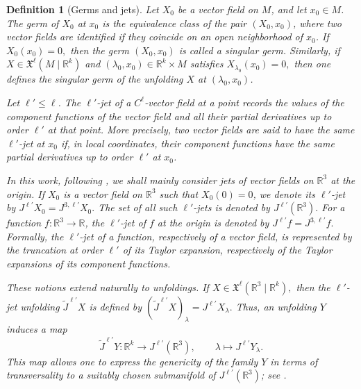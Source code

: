 \documentclass[12pt]{article}
\newtheorem{definition}{Definition}[section]
\newtheorem{remark definition}{Remark Definition}[section]
\begin{document}
	\begin{definition}[Germs and jets]
		Let $X_0$ be a vector field on $M$, and let $x_0\in M$. The germ of
		$X_0$ at $x_0$ is the equivalence class of the pair $(X_0,x_0)$, where two
		vector fields are identified if they coincide on an open neighborhood of
		$x_0$. If $X_0(x_0)=0,$ then the germ $(X_0,x_0)$ is called a singular germ. 
		Similarly, if $X\in \mathfrak{X}^{\ell}(M\mid \mathbb{R}^k)	$
		and $(\lambda_0,x_0)\in \mathbb{R}^k\times M$ satisfies $X_{\lambda_0}(x_0)=0,
		$
		then one defines the singular germ of the unfolding $X$ at
		$(\lambda_0,x_0)$.
		
		Let $\ell'\leq \ell$. The $\ell'$-jet of a $C^\ell$-vector field at a
		point records the values of the component functions of the vector field and
		all their partial derivatives up to order $\ell'$ at that point. More
		precisely, two vector fields are said to have the same $\ell'$-jet at
		$x_0$ if, in local coordinates, their component functions have the same
		partial derivatives up to order $\ell'$ at $x_0$.
		
		In this work, following \cite[Def.~1.2]{v}, we shall mainly consider jets
		of vector fields on $\mathbb{R}^3$ at the origin. If $X_0$ is a vector
		field on $\mathbb{R}^3$ such that $X_0(0)=0$, we denote its $\ell'$-jet by
		$J^{\ell'}X_0=J^{3,\ell'}X_0.$
		The set of all such $\ell'$-jets is denoted by $J^{\ell'}(\mathbb{R}^3).$
		For a function $f:\mathbb{R}^3\to \mathbb{R}$, the $\ell'$-jet of $f$ at
		the origin is denoted by $J^{\ell'}f=J^{3,\ell'}f.$		
		Formally, the $\ell'$-jet of a function, respectively of a vector field,
		is represented by the truncation at order $\ell'$ of its Taylor expansion,
		respectively of the Taylor expansions of its component functions.
		
		These notions extend naturally to unfoldings. If $
		X\in \mathfrak{X}^{\ell}(\mathbb{R}^3\mid \mathbb{R}^k),$
		then the $\ell'$-jet unfolding $\widetilde{J}^{\ell'}X$ is defined by
		$(\widetilde{J}^{\ell'}X)_\lambda=J^{\ell'}X_\lambda.$
		Thus, an unfolding $Y$ induces a map
		$$
		\widetilde{J}^{\ell'}Y:
		\mathbb{R}^k\longrightarrow J^{\ell'}(\mathbb{R}^3),
		\qquad
		\lambda\longmapsto J^{\ell'}Y_\lambda.
		$$
		This map allows one to express the genericity of the family $Y$ in terms of
		transversality to a suitably chosen submanifold of
		$J^{\ell'}(\mathbb{R}^3)$; see \cite{iv}.
	\end{definition}
	
\end{document}
